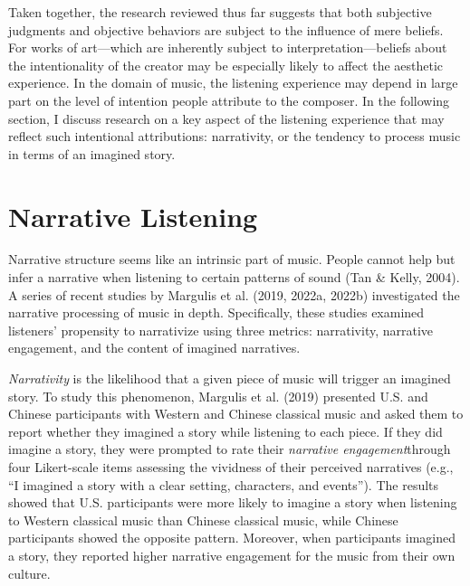 \documentclass[12pt,twoside]{reedthesis}
\begin{document}
Taken together, the research reviewed thus far suggests that both subjective judgments and objective behaviors are subject to the influence of mere beliefs. For works of art—which are inherently subject to interpretation—beliefs about the intentionality of the creator may be especially likely to affect the aesthetic experience. In the domain of music, the listening experience may depend in large part on the level of intention people attribute to the composer. In the following section, I discuss research on a key aspect of the listening experience that may reflect such intentional attributions: narrativity, or the tendency to process music in terms of an imagined story. 

\section*{Narrative Listening}

Narrative structure seems like an intrinsic part of music. People cannot help but infer a narrative when listening to certain patterns of sound (Tan \& Kelly, 2004). A series of recent studies by Margulis et al. (2019, 2022a, 2022b) investigated the narrative processing of music in depth. Specifically, these studies examined listeners’ propensity to narrativize using three metrics: narrativity, narrative engagement, and the content of imagined narratives. 

\emph{Narrativity} is the likelihood that a given piece of music will trigger an imagined story. To study this phenomenon, Margulis et al. (2019) presented U.S. and Chinese participants with Western and Chinese classical music and asked them to report whether they imagined a story while listening to each piece. If they did imagine a story, they were prompted to rate their \emph{narrative engagement}through four Likert-scale items assessing the vividness of their perceived narratives (e.g., “I imagined a story with a clear setting, characters, and events”). The results showed that U.S. participants were more likely to imagine a story when listening to Western classical music than Chinese classical music, while Chinese participants showed the opposite pattern. Moreover, when participants imagined a story, they reported higher narrative engagement for the music from their own culture. 
\end{document}
